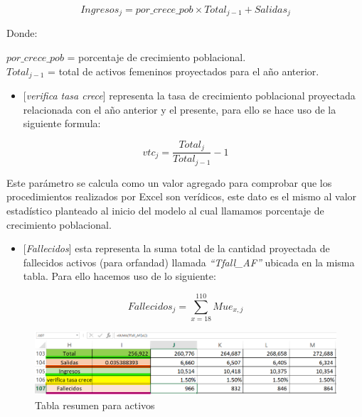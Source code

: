 \documentclass[
  letterpaper,
  DIV=11,
  numbers=noendperiod]{scrreprt}
\providecommand{\tightlist}{%
  \setlength{\itemsep}{0pt}\setlength{\parskip}{0pt}}\usepackage{longtable,booktabs,array}
\begin{document}
\begin{equation}
Ingresos_j=por\_{crece\_{pob}}\times{Total}_{j-1}+{Salidas}_j
\end{equation}

Donde:

\(por\_crece\_pob\) = porcentaje de crecimiento poblacional.\\
\({Total}_{j-1}\) = total de activos femeninos proyectados para el año
anterior.

\begin{itemize}
\tightlist
\item
  {[}\emph{verifica tasa crece}{]} representa la tasa de crecimiento
  poblacional proyectada relacionada con el año anterior y el presente,
  para ello se hace uso de la siguiente formula:
\end{itemize}

\begin{equation}
{vtc}_j=\frac{{Total}_j}{{Total}_{j-1}}-1
\end{equation}

Este parámetro se calcula como un valor agregado para comprobar que los
procedimientos realizados por Excel son verídicos, este dato es el mismo
al valor estadístico planteado al inicio del modelo al cual llamamos
porcentaje de crecimiento poblacional.

\begin{itemize}
\tightlist
\item
  {[}\emph{Fallecidos}{]} esta representa la suma total de la cantidad
  proyectada de fallecidos activos (para orfandad) llamada
  \emph{``Tfall\_AF''} ubicada en la misma tabla. Para ello hacemos uso
  de lo siguiente:
\end{itemize}

\begin{equation}
{Fallecidos}_j=\sum_{x=18}^{110}{Mue}_{x,j}
\end{equation}

\begin{figure}

{\centering \includegraphics{images/F/Img14.png}

}

\caption{Tabla resumen para activos}

\end{figure}
\end{document}
